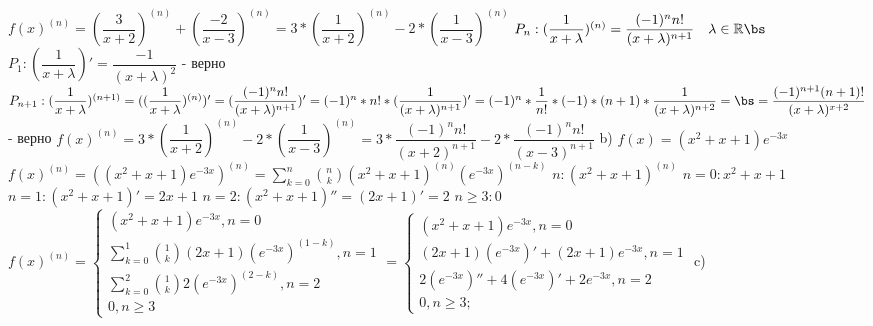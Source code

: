 \documentclass[11pt]{article}
\begin{document}
	$f(x)^{(n)} = (\dfrac{3}{x + 2})^{(n)} + (\dfrac{-2}{x - 3})^{(n)} = 3 * (\dfrac{1}{x + 2})^{(n)} - 2 * (\dfrac{1}{x - 3})^{(n)}$ \bs
	$P_n: (\dfrac{1}{x + \lambda})^{(n)} = \dfrac{(-1)^nn!}{(x + \lambda)^{n + 1}} \quad \lambda \in \mathbb{R}\bs$
	$P_1: (\dfrac{1}{x + \lambda})' = \dfrac{-1}{(x + \lambda)^2}$ - верно \bs
	$P_{n + 1}: (\dfrac{1}{x + \lambda})^{(n + 1)} = ((\dfrac{1}{x + \lambda})^{(n)})' = (\dfrac{(-1)^nn!}{(x + \lambda)^{n + 1}})' = (-1)^n * n! * (\dfrac{1}{(x + \lambda)^{n + 1}})' = (-1)^n * \dfrac{1}{n!} * (-1) * (n + 1) * \dfrac{1}{(x + \lambda)^{n + 2}} = \bs =  \dfrac{(-1)^{n + 1}(n + 1)!}{(x + \lambda)^{x + 2}}$ - верно \bs
	$f(x)^{(n)} = 3 * (\dfrac{1}{x + 2})^{(n)} - 2 * (\dfrac{1}{x - 3})^{(n)} = 3 * \dfrac{(-1)^{n}n!}{(x + 2)^{n + 1}} -2 * \dfrac{(-1)^{n}n!}{(x - 3)^{n + 1}}$ \bs
	b) $f(x) = (x ^ 2 + x + 1)e^{-3x}$ \sspace
	$f(x)^{(n)} = ((x ^ 2 + x + 1)e^{-3x})^{(n)} = \sum\limits_{k = 0}^{n}\binom{n}{k}(x ^ 2 + x + 1)^{(n)}(e^{-3x})^{(n - k)}$ \bs
	$n: (x ^ 2 + x + 1)^{(n)}$ \sspace
	$n = 0: x ^ 2 + x + 1$ \sspace
	$n = 1: (x ^ 2 + x + 1)' = 2x + 1$ \sspace
	$n = 2: (x ^ 2 + x + 1)'' = (2x + 1)' = 2$ \sspace
	$n\geq3: 0$	\sspace
	$f(x)^{(n)} = \begin{cases} 
		(x ^ 2 + x + 1)e^{-3x}, n = 0\\  
		\sum\limits_{k = 0}^{1}\binom{1}{k}(2x + 1)(e^{-3x})^{(1 - k)}, n = 1\\
		\sum\limits_{k = 0}^{2}\binom{1}{k}2(e^{-3x})^{(2 - k)}, n = 2 \\
		 0, n \geq 3
	\end{cases}
	= \begin{cases} 
		(x ^ 2 + x + 1)e^{-3x}, n = 0 \\
		(2x + 1)(e^{-3x})' + (2x + 1)e^{-3x}, n = 1 \\
		2(e^{-3x})'' + 4(e^{-3x})' + 2e^{-3x}, n = 2 \\
		0, n \geq 3;
	\end{cases}
	$
	\bs 
	c) 
\end{document}
